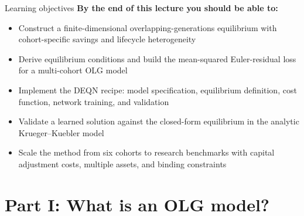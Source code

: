 \documentclass[aspectratio=169,11pt]{beamer}
\begin{document}
\begin{frame}{Learning objectives}
\textbf{By the end of this lecture you should be able to:}
\begin{itemize}
  \item Construct a finite-dimensional overlapping-generations equilibrium with cohort-specific savings and lifecycle heterogeneity
  \item Derive equilibrium conditions and build the mean-squared Euler-residual loss for a multi-cohort OLG model
  \item Implement the DEQN recipe: model specification, equilibrium definition, cost function, network training, and validation
  \item Validate a learned solution against the closed-form equilibrium in the analytic Krueger--Kuebler model
  \item Scale the method from six cohorts to research benchmarks with capital adjustment costs, multiple assets, and binding constraints
\end{itemize}
\end{frame}




\section{Part I: What is an OLG model?}
\end{document}
